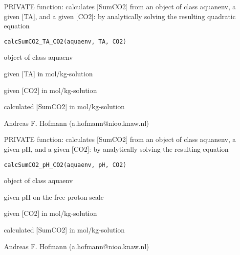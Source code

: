 \documentclass{article}
\begin{document}
\begin{Description}\relax
PRIVATE function: calculates [SumCO2] from an object of class aquanenv, a given [TA], and a given [CO2]: by analytically solving the resulting quadratic equation
\end{Description}
\begin{Usage}
\begin{verbatim}calcSumCO2_TA_CO2(aquaenv, TA, CO2)\end{verbatim}
\end{Usage}
\begin{Arguments}
\begin{ldescription}
\item[\code{aquaenv }] object of class aquaenv
\item[\code{TA }] given [TA] in mol/kg-solution
\item[\code{CO2 }] given [CO2] in mol/kg-solution
\end{ldescription}
\end{Arguments}
\begin{Value}
calculated [SumCO2] in mol/kg-solution
\end{Value}
\begin{Author}\relax
Andreas F. Hofmann (a.hofmann@nioo.knaw.nl)
\end{Author}

\begin{Description}\relax
PRIVATE function: calculates [SumCO2]  from an object of class aquanenv, a given pH, and a given [CO2]: by analytically solving the resulting equation
\end{Description}
\begin{Usage}
\begin{verbatim}calcSumCO2_pH_CO2(aquaenv, pH, CO2)\end{verbatim}
\end{Usage}
\begin{Arguments}
\begin{ldescription}
\item[\code{aquaenv }] object of class aquaenv
\item[\code{pH }] given pH on the free proton scale
\item[\code{CO2 }] given [CO2] in mol/kg-solution
\end{ldescription}
\end{Arguments}
\begin{Value}
calculated [SumCO2] in mol/kg-solution
\end{Value}
\begin{Author}\relax
Andreas F. Hofmann (a.hofmann@nioo.knaw.nl)
\end{Author}
\end{document}
